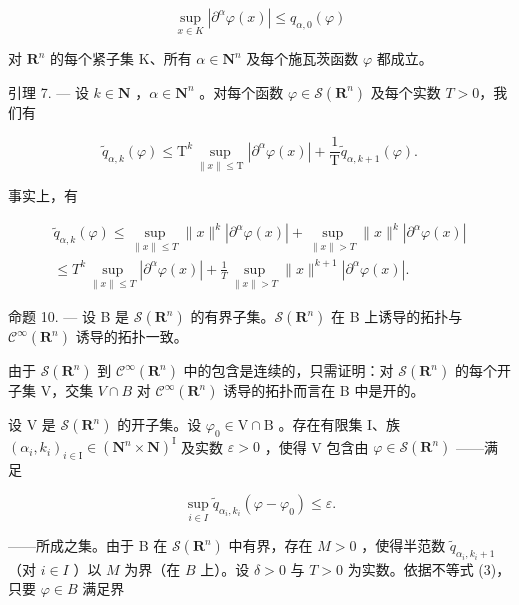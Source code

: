 \[
\sup _ {x \in K} | \partial^ {\alpha} \varphi (x) | \leqslant q _ {\alpha , 0} (\varphi)
\]

对 \(\mathbf{R}^{n}\) 的每个紧子集 K、所有 \(\alpha \in \mathbf{N}^{n}\) 及每个施瓦茨函数 \(\varphi\) 都成立。

引理 7. --- 设 \(k \in \mathbf{N}\) ，\(\alpha \in \mathbf{N}^n\) 。对每个函数 \(\varphi \in \mathcal{S}(\mathbf{R}^n)\) 及每个实数 \(T > 0\)，我们有

\[
\widetilde {q} _ {\alpha , k} (\varphi) \leqslant \mathrm{T} ^ {k} \sup _ {\| x \| \leqslant \mathrm{T}} | \partial^ {\alpha} \varphi (x) | + \frac {1}{\mathrm{T}} \widetilde {q} _ {\alpha , k + 1} (\varphi).\tag{3}
\]

事实上，有

\[
\begin{array}{c} \widetilde {q} _ {\alpha , k} (\varphi) \leqslant \sup _ {\| x \| \leqslant T} \| x \| ^ {k} | \partial^ {\alpha} \varphi (x) | + \sup _ {\| x \| > T} \| x \| ^ {k} | \partial^ {\alpha} \varphi (x) | \\ \leqslant T ^ {k} \sup _ {\| x \| \leqslant T} | \partial^ {\alpha} \varphi (x) | + \frac {1}{T} \sup _ {\| x \| > T} \| x \| ^ {k + 1} | \partial^ {\alpha} \varphi (x) |. \end{array}
\]

命题 10. --- 设 B 是 \(\mathcal{S}(\mathbf{R}^{n})\) 的有界子集。\(\mathcal{S}(\mathbf{R}^{n})\) 在 B 上诱导的拓扑与 \(\mathcal{C}^{\infty}(\mathbf{R}^{n})\) 诱导的拓扑一致。

由于 \(\mathcal{S}(\mathbf{R}^{n})\) 到 \(\mathcal{C}^{\infty}(\mathbf{R}^{n})\) 中的包含是连续的，只需证明：对 \(\mathcal{S}(\mathbf{R}^{n})\) 的每个开子集 V，交集 \(V \cap B\) 对 \(\mathcal{C}^{\infty}(\mathbf{R}^{n})\) 诱导的拓扑而言在 B 中是开的。

设 V 是 \(\mathcal{S}(\mathbf{R}^{n})\) 的开子集。设 \(\varphi_{0} \in \mathrm{V} \cap \mathrm{B}\) 。存在有限集 I、族 \((\alpha_{i}, k_{i})_{i \in \mathrm{I}} \in (\mathbf{N}^{n} \times \mathbf{N})^{\mathrm{I}}\) 及实数 \(\varepsilon > 0\) ，使得 V 包含由 \(\varphi \in \mathcal{S}(\mathbf{R}^{n})\) ——满足

\[
\sup _ {i \in I} \widetilde {q} _ {\alpha_ {i}, k _ {i}} (\varphi - \varphi_ {0}) \leqslant \varepsilon .
\]

——所成之集。由于 B 在 \(\mathcal{S}(\mathbf{R}^{n})\) 中有界，存在 \(M > 0\) ，使得半范数 \(\widetilde{q}_{\alpha_{i},k_{i} + 1}\) （对 \(i\in I\) ）以 \(M\) 为界（在 \(B\) 上）。设 \(\delta >0\) 与 \(T > 0\) 为实数。依据不等式 (3)，只要 \(\varphi \in B\) 满足界

